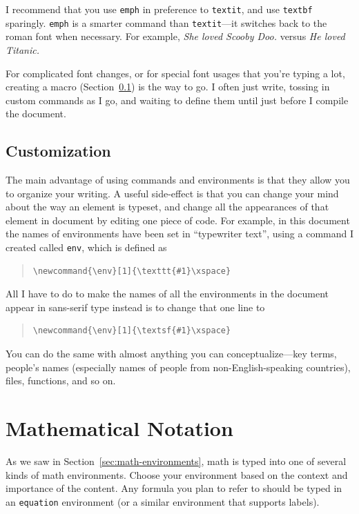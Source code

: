 \documentclass{icmmcm}
\newcommand{\bslash}{\symbol{'134}}%
\newcommand{\bsl}{{\texttt{\bslash}}}
\newcommand{\com}[1]{\bsl\texttt{#1}\xspace}
\newcommand{\env}[1]{\texttt{#1}\xspace}
\newcommand{\command}[1]{\texttt{\bsl{}#1}\xspace}
\begin{document}
{I recommend that you use \com{emph} in preference to \com{textit}, and
use \com{textbf} sparingly.  \com{emph} is a smarter command than
\com{textit}---it switches back to the roman font when necessary.  For
example, \emph{She loved \emph{Scooby Doo}.} versus \textit{He loved
  \textit{Titanic}.}

For complicated font changes, or for special font usages that you're
typing a lot, creating a macro (Section~\ref{sec:customization}) is
the way to go.  I often just write, tossing in custom commands as I
go, and waiting to define them until just before I compile the
document.


\subsection{Customization}%
\label{sec:customization}

The main advantage of using commands and environments is that they
allow you to organize your writing.  A useful side-effect is that you
can change your mind about the way an element is typeset, and change
all the appearances of that element in document by editing one piece
of code.  For example, in this document the names of environments have
been set in ``typewriter text'', using a command I created called
\command{env}, which is defined as
\begin{quote}
\begin{verbatim}
\newcommand{\env}[1]{\texttt{#1}\xspace}
\end{verbatim}
\end{quote}

All I have to do to make the names of all the environments in the
document appear in sans-serif type instead is to change that one line
to
\begin{quote}
\begin{verbatim}
\newcommand{\env}[1]{\textsf{#1}\xspace}
\end{verbatim}
\end{quote}

You can do the same with almost anything you can conceptualize---key
terms, people's names (especially names of people from
non-English-speaking countries), files, functions, and so on.


\section{Mathematical Notation}%
\label{sec:mathematical-notation}

As we saw in Section~\ref{sec:math-environments}, math is typed into
one of several kinds of math environments.  Choose your environment
based on the context and importance of the content.  Any formula you
plan to refer to should be typed in an \env{equation} environment (or
a similar environment that supports labels).

}
\end{document}
